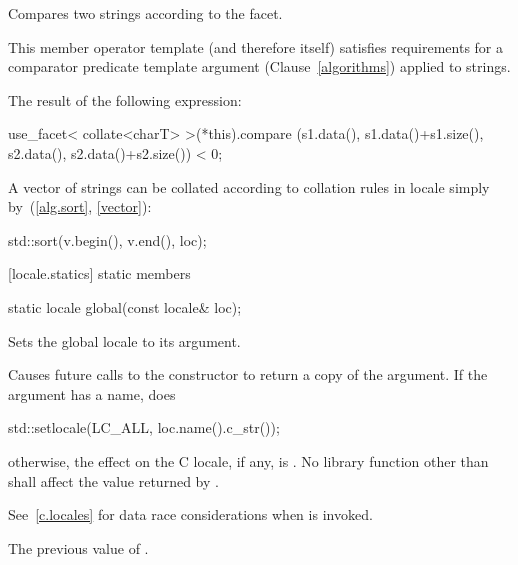 \begin{itemdescr}
\pnum
\effects
Compares two strings according to the
facet.

\pnum
\remarks
This member operator template (and therefore
itself) satisfies requirements for a comparator predicate template argument
(Clause~\ref{algorithms}) applied to strings.

\pnum
\returns
The result of the following expression:

\begin{codeblock}
use_facet< collate<charT> >(*this).compare
  (s1.data(), s1.data()+s1.size(), s2.data(), s2.data()+s2.size()) < 0;
\end{codeblock}

\pnum
\begin{example}
A vector of strings
can be collated according to collation rules in locale
simply by~(\ref{alg.sort}, \ref{vector}):

\begin{codeblock}
std::sort(v.begin(), v.end(), loc);
\end{codeblock}
\end{example}
\end{itemdescr}

[locale.statics]{ static members}

%
%
\begin{itemdecl}
static locale global(const locale& loc);
\end{itemdecl}

\begin{itemdescr}
\pnum
Sets the global locale to its argument.

\pnum
\effects
Causes future calls to the constructor
to return a copy of the argument.
If the argument has a name, does

\begin{codeblock}
std::setlocale(LC_ALL, loc.name().c_str());
\end{codeblock}

otherwise, the effect on the C locale, if any, is .
No library function other than
shall affect the value returned by
.
\begin{note} See~\ref{c.locales} for data race considerations when
 is invoked. \end{note}

\pnum
\returns
The previous value of
.
\end{itemdescr}

